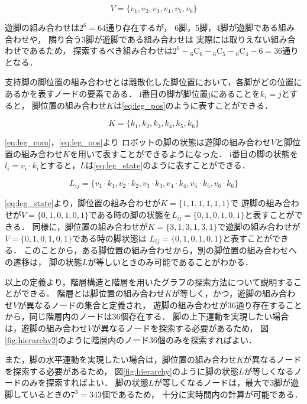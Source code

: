 \begin{equation}\label{eq:leg_com}
  V = \{v_1, v_2, v_3, v_4, v_5, v_6\}
\end{equation}

\noindent 遊脚の組み合わせは$2^6 = 64$通り存在するが，
6脚，5脚，4脚が遊脚である組み合わせや，
隣り合う3脚が遊脚である組み合わせは
実際には取りえない組み合わせであるため，
探索するべき組み合わせは$2^6 - {}_6 \mathrm{C}_6 - {}_6 \mathrm{C}_5 - {}_6 \mathrm{C}_4 - 6 = 36$通りとなる．

支持脚の脚位置の組み合わせとは離散化した脚位置において，各脚がどの位置にあるかを表すノードの要素である．
i番目の脚が脚位置jにあることを$k_i = j$とすると，
脚位置の組み合わせ$K$は\eqref{eq:leg_pos}のように表すことができる．

\begin{equation}\label{eq:leg_pos}
  K = \{k_1, k_2, k_3, k_4, k_5, k_6\}
\end{equation}

\noindent\eqref{eq:leg_com}，\eqref{eq:leg_pos}より
ロボットの脚の状態は遊脚の組み合わせ$V$と脚位置の組み合わせ$K$を用いて表すことができるようになった．
i番目の脚の状態を$l_i = v_i \cdot k_i$とすると，$L$は\eqref{eq:leg_state}のように表すことができる．

\begin{equation}\label{eq:leg_state}
  L_{ij} = \{v_1 \cdot k_1, v_2 \cdot k_2, v_3 \cdot k_3, v_4 \cdot k_4, v_5 \cdot k_5, v_6 \cdot k_6\}
\end{equation}

\noindent\eqref{eq:leg_state}より，脚位置の組み合わせが$K = \{1,1,1,1,1,1\}$で
遊脚の組み合わせが$V = \{0,1,0,1,0,1\}$である時の脚の状態を$L_{ij} = \{0,1,0,1,0,1\}$と表すことができる．
同様に，脚位置の組み合わせが$K = \{3,1,3,1,3,1\}$で遊脚の組み合わせが$V = \{0,1,0,1,0,1\}$である時の脚状態は
$L_{ij} = \{0,1,0,1,0,1\}$と表すことができる．
このことから，ある脚位置の組み合わせから，別の脚位置の組み合わせへの遷移は，
脚の状態$L$が等しいときのみ可能であることがわかる．

以上の定義より，階層構造と階層を用いたグラフの探索方法について説明することができる．
階層とは脚位置の組み合わせ$K$が等しく，かつ，遊脚の組み合わせ$V$が異なるノードの集合と定義され，
遊脚の組み合わせが36通り存在することから，同じ階層内のノードは36個存在する．
脚の上下運動を実現したい場合は，遊脚の組み合わせ$V$が異なるノードを探索する必要があるため，
図\ref{fig:hierarchy2}のように階層内のノード36個のみを探索すればよい．

また，脚の水平運動を実現したい場合は，脚位置の組み合わせ$K$が異なるノードを探索する必要があるため，
図\ref{fig:hierarchy}のように脚の状態$L$が等しくなるノードのみを探索すればよい．
脚の状態$L$が等しくなるノードは，最大で3脚が遊脚しているときの$7^3 = 343$個であるため，
十分に実時間内の計算が可能である．


